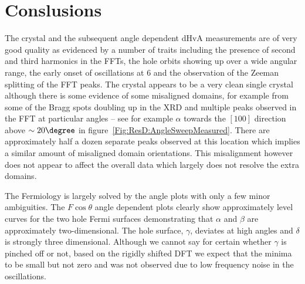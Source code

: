 
\section{Conslusions}

The \BaFeP crystal and the subsequent angle dependent \ac{dHvA} measurements are of very good quality as evidenced by a number of traits including the presence of second and third harmonics in the \acp{FFT}, the hole orbits showing up over a wide angular range, the early onset of oscillations at \unit{6}{\tesla} and the observation of the Zeeman splitting of the \ac{FFT} peaks. The crystal appears to be a very clean single crystal although there is some evidence of some misaligned domains, for example from some of the Bragg spots doubling up in the \ac{XRD} and multiple peaks observed in the \ac{FFT} at particular angles -- see for example $\alpha$ towards the $[100]$ direction above $\sim 20\degree$ in figure~\ref{Fig:ResD:AngleSweepMeasured}. There are approximately half a dozen separate peaks observed at this location which implies a similar amount of misaligned domain orientations. This misalignment however does not appear to affect the overall data which largely does not resolve the extra domains.

The Fermiology is largely solved by the angle plots with only a few minor ambiguities.  The $F\cos \theta$ angle dependent plots clearly show approximately level curves for the two hole Fermi surfaces demonstrating that $\alpha$ and $\beta$ are approximately two-dimensional. The hole surface, $\gamma$, deviates at high angles and $\delta$ is strongly three dimensional. Although we cannot say for certain whether $\gamma$ is pinched off or not, based on the rigidly shifted \ac{DFT} we expect that the minima to be small but not zero and was not observed due to low frequency noise in the oscillations.

